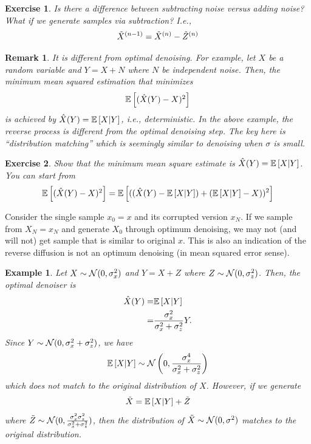 \documentclass[11pt]{article}
\newtheorem{exercise}{Exercise}
\newtheorem{remark}{Remark}
\newtheorem{example}{Example}
\begin{document}
\begin{exercise}
    Is there a difference between subtracting noise versus adding noise?
    What if we generate samples via subtraction? I.e.,
    \begin{align}
        \tilde{X}^{(n-1)} = \tilde{X}^{(n)} - \tilde{Z}^{(n)}
    \end{align}
\end{exercise}

\begin{remark}
    It is different from optimal denoising.
    For example, let $X$ be a random variable and $Y= X+N$ where $N$ be independent noise.
    Then, the minimum mean squared estimation that minimizes
    \begin{align}
        \Expec{(\hat{X}(Y)- X)^2}
    \end{align}
    is achieved by $\hat{X}(Y) = \Expec{X|Y}$, i.e., deterministic.
    In the above example, the reverse process is different from the optimal denoising step.
    The key here is ``distribution matching'' which is seemingly similar to denoising when $\sigma$ is small.
\end{remark}

\begin{exercise}
    Show that the minimum mean square estimate is $\hat{X}(Y) = \Expec{X|Y}$.
    You can start from
    \begin{align}
        \Expec{(\hat{X}(Y)-X)^2} = \Expec{((\hat{X}(Y)-\Expec{X|Y}) +(\Expec{X|Y}-X) )^2}
    \end{align}
\end{exercise}

Consider the single sample $x_0=x$ and its corrupted version $x_N$.
If we sample from $X_N = x_N$ and generate $X_0$ through optimum denoising, we may not (and will not) get sample that is similar to original $x$.
This is also an indication of the reverse diffusion is not an optimum denoising (in mean squared error sense).

\begin{example}
    Let $X\sim {\cal N}(0, \sigma_x^2)$ and $Y=X+Z$ where $Z\sim{\cal N}(0, \sigma_z^2)$.
    Then, the optimal denoiser is
    \begin{align}
        \hat{X}(Y) =& \Expec{X|Y}\\
        =& \frac{\sigma_x^2}{\sigma_x^2 + \sigma_z^2} Y.
    \end{align}
    Since $Y\sim {\cal N}(0, \sigma_x^2 + \sigma_z^2)$, we have
    \begin{align}
        \Expec{X|Y} \sim \cN\left(0, \frac{\sigma_x^4}{\sigma_x^2+\sigma_z^2}\right)
    \end{align}
    which does not match to the original distribution of $X$.
    However, if we generate
    \begin{align}
        \tilde{X} = \Expec{X|Y} + \tilde{Z}
    \end{align}
    where $\tilde{Z}\sim{\cal N}(0, \frac{\sigma_x^2\sigma_z^2}{\sigma_x^2+\sigma_z^2})$,
    then the distribution of $\tilde{X}\sim{\cal N}(0, \sigma^2)$ matches to the original distribution.
\end{example}
\end{document}
